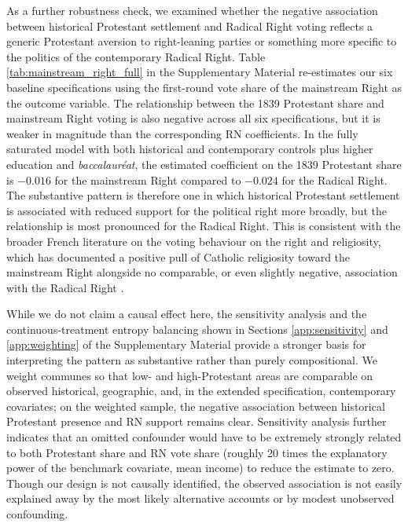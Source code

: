 \documentclass[12pt]{article}
\begin{document}
As a further robustness check, we examined whether the negative association between historical Protestant settlement and Radical Right voting reflects a generic Protestant aversion to right-leaning parties or something more specific to the politics of the contemporary Radical Right. Table \ref{tab:mainstream_right_full} in the Supplementary Material re-estimates our six baseline specifications using the first-round vote share of the mainstream Right as the outcome variable. The relationship between the 1839 Protestant share and mainstream Right voting is also negative across all six specifications, but it is weaker in magnitude than the corresponding RN coefficients. In the fully saturated model with both historical and contemporary controls plus higher education and \textit{baccalauréat}, the estimated coefficient on the 1839 Protestant share is $-0.016$ for the mainstream Right compared to $-0.024$ for the Radical Right. The substantive pattern is therefore one in which historical Protestant settlement is associated with reduced support for the political right more broadly, but the relationship is most pronounced for the Radical Right. This is consistent with the broader French literature on the voting behaviour on the right and religiosity, which has documented a positive pull of Catholic religiosity toward the mainstream Right alongside no comparable, or even slightly negative, association with the Radical Right \parencite{lewis-beck2004, boyLelecteurSesRaisons1997a, mayerFrontNationalVote1998, michelatSystemeSymboliqueCatholique2015, overosDieuDansCommune2023}.

While we do not claim a causal effect here, the sensitivity analysis and the continuous-treatment entropy balancing shown in Sections \ref{app:sensitivity} and \ref{app:weighting} of the Supplementary Material provide a stronger basis for interpreting the pattern as substantive rather than purely compositional. We weight communes so that low- and high-Protestant areas are comparable on observed historical, geographic, and, in the extended specification, contemporary covariates; on the weighted sample, the negative association between historical Protestant presence and RN support remains clear. Sensitivity analysis further indicates that an omitted confounder would have to be extremely strongly related to both Protestant share and RN vote share (roughly 20 times the explanatory power of the benchmark covariate, mean income) to reduce the estimate to zero. Though our design is not causally identified, the observed association is not easily explained away by the most likely alternative accounts or by modest unobserved confounding.
\end{document}
